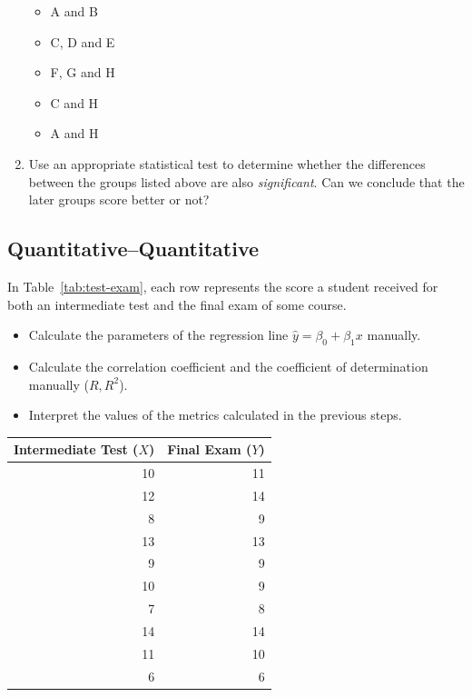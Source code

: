 \begin{exercise}
\begin{enumerate}
    \begin{itemize}
      \item A and B
      \item C, D and E
      \item F, G and H
      \item C and H
      \item A and H
    \end{itemize}
    
    \item Use an appropriate statistical test to determine whether the differences between the groups listed above are also \emph{significant}. Can we conclude that the later groups score better or not?
  \end{enumerate}
\end{exercise}

\subsection{Quantitative--Quantitative}
\label{ssec:ex-quantitative-quantitative}

\begin{exercise}
  \label{ex:test-examen}
  In Table~\ref{tab:test-exam}, each row represents the score a student received for both an intermediate test and the final exam of some course.
  \begin{itemize}
    \item Calculate the parameters of the regression line $\hat{y}=\beta_{0} + \beta_{1} x$ manually. 
    \item Calculate the correlation coefficient and the coefficient of determination manually ($R, R^{2}$).
    \item Interpret the values of the metrics calculated in the previous steps.
  \end{itemize}
  
  \centering
  \begin{tabular}{@{}rr@{}} \toprule
    Intermediate Test ($X$) & Final Exam ($Y$) \\
    \midrule
    10 & 11 \\
    12 & 14 \\
    8 & 9 \\
    13 & 13 \\
    9 & 9 \\
    10 &  9 \\
    7 & 8 \\
    14 & 14 \\
    11 & 10 \\
    6 & 6  \\
    \bottomrule
  \end{tabular}
  \label{tab:test-exam}
\end{exercise}

